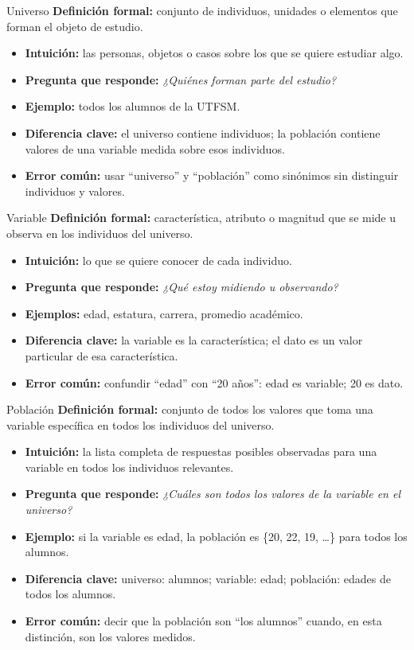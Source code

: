 \documentclass[aspectratio=169,11pt]{beamer}
\newcommand{\pregunta}[1]{\textbf{Pregunta que responde:} \emph{#1}}
\newcommand{\errorcomun}[1]{\textbf{Error común:} #1}
\newcommand{\diferencia}[1]{\textbf{Diferencia clave:} #1}
\begin{document}
\begin{frame}{Universo}
\textbf{Definición formal:} conjunto de individuos, unidades o elementos que forman el objeto de estudio.
\begin{itemize}
  \item \textbf{Intuición:} las personas, objetos o casos sobre los que se quiere estudiar algo.
  \item \pregunta{¿Quiénes forman parte del estudio?}
  \item \textbf{Ejemplo:} todos los alumnos de la UTFSM.
  \item \diferencia{el universo contiene individuos; la población contiene valores de una variable medida sobre esos individuos.}
  \item \errorcomun{usar ``universo'' y ``población'' como sinónimos sin distinguir individuos y valores.}
\end{itemize}
\end{frame}

\begin{frame}{Variable}
\textbf{Definición formal:} característica, atributo o magnitud que se mide u observa en los individuos del universo.
\begin{itemize}
  \item \textbf{Intuición:} lo que se quiere conocer de cada individuo.
  \item \pregunta{¿Qué estoy midiendo u observando?}
  \item \textbf{Ejemplos:} edad, estatura, carrera, promedio académico.
  \item \diferencia{la variable es la característica; el dato es un valor particular de esa característica.}
  \item \errorcomun{confundir ``edad'' con ``20 años'': edad es variable; 20 es dato.}
\end{itemize}
\end{frame}

\begin{frame}{Población}
\textbf{Definición formal:} conjunto de todos los valores que toma una variable específica en todos los individuos del universo.
\begin{itemize}
  \item \textbf{Intuición:} la lista completa de respuestas posibles observadas para una variable en todos los individuos relevantes.
  \item \pregunta{¿Cuáles son todos los valores de la variable en el universo?}
  \item \textbf{Ejemplo:} si la variable es edad, la población es \{20, 22, 19, \dots\} para todos los alumnos.
  \item \diferencia{universo: alumnos; variable: edad; población: edades de todos los alumnos.}
  \item \errorcomun{decir que la población son ``los alumnos'' cuando, en esta distinción, son los valores medidos.}
\end{itemize}
\end{frame}
\end{document}
